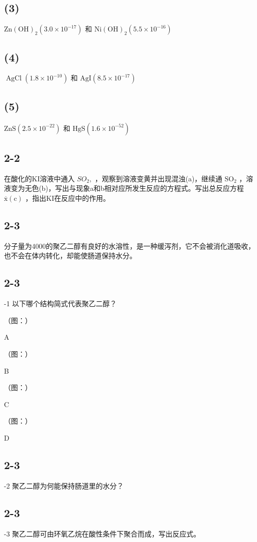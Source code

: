 \subsection*{(3)}
$\mathrm { Z n ( O H ) } _ { 2 } \left( 3 . 0 { \times } 1 0 ^ { - 1 7 } \right)$ 和 $\mathrm { N i ( O H ) } _ { 2 } \left( 5 . 5 \times 1 0 ^ { - 1 6 } \right)$

\subsection*{(4)}
$\operatorname { A g C l } \left( 1 . 8 \times 1 0 ^ { - 1 0 } \right)$ 和 $\mathrm { A g I } \left( 8 . 5 \times 1 0 ^ { - 1 7 } \right)$

\subsection*{(5)}
$\mathrm { Z n S } \left( 2 . 5 { \times } 1 0 ^ { - 2 2 } \right)$ 和 $\mathrm { H g S } \left( 1 . 6 \times 1 0 ^ { - 5 2 } \right)$

\subsection*{2-2}
在酸化的KI溶液中通⼊ $S O _ { 2 } ,$ ，观察到溶液变⻩并出现混浊(a)，继续通 $\mathrm { S O } _ { 2 }$ ，溶液变为⽆⾊(b)，写出与现象a和b相对应所发⽣反应的⽅程式。写出总反应⽅程 $\operatorname { \overline { { x } } } \mathrm { ( c ) }$ ，指出KI在反应中的作⽤。

\subsection*{2-3}
分⼦量为4000的聚⼄⼆醇有良好的⽔溶性，是⼀种缓泻剂，它不会被消化道吸收，也不会在体内转化，却能使肠道保持⽔分。

\subsection*{2-3}
-1 以下哪个结构简式代表聚⼄⼆醇？

（图：）

A

（图：）

B

（图：）

C

（图：）

D

\subsection*{2-3}
-2 聚⼄⼆醇为何能保持肠道⾥的⽔分？

\subsection*{2-3}
-3 聚⼄⼆醇可由环氧⼄烷在酸性条件下聚合⽽成，写出反应式。
